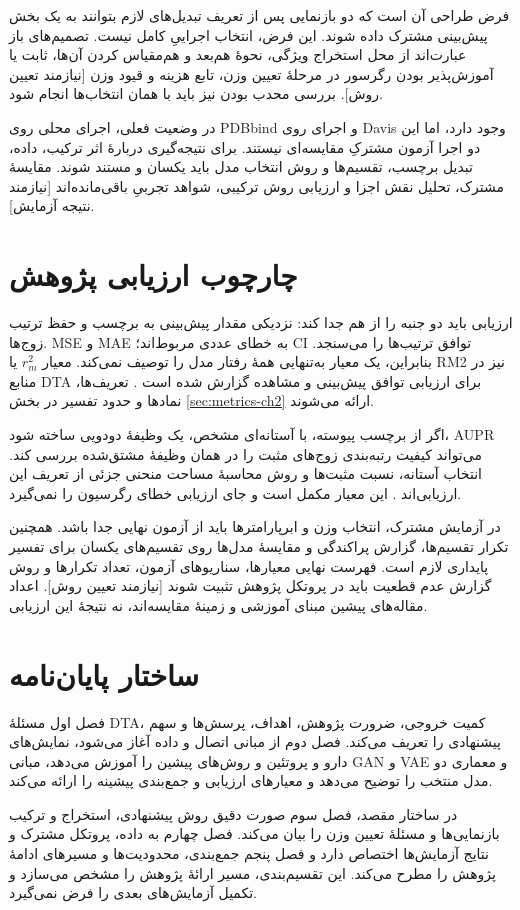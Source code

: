 فرض طراحی آن است که دو بازنمایی پس از تعریف تبدیل‌های لازم بتوانند به یک بخش پیش‌بینی مشترک داده شوند. این فرض، انتخاب اجراییِ کامل نیست. تصمیم‌های باز عبارت‌اند از محل استخراج ویژگی، نحوهٔ هم‌بعد و هم‌مقیاس کردن آن‌ها، ثابت یا آموزش‌پذیر بودن رگرسور در مرحلهٔ تعیین وزن، تابع هزینه و قیود وزن [نیازمند تعیین روش]. بررسی محدب بودن نیز باید با همان انتخاب‌ها انجام شود.

در وضعیت فعلی، اجرای محلی  روی PDBbind و اجرای  روی Davis وجود دارد، اما این دو اجرا آزمون مشترکِ مقایسه‌ای نیستند. برای نتیجه‌گیری دربارهٔ اثر ترکیب، داده، تبدیل برچسب، تقسیم‌ها و روش انتخاب مدل باید یکسان و مستند شوند. مقایسهٔ مشترک، تحلیل نقش اجزا و ارزیابی روش ترکیبی، شواهد تجربیِ باقی‌مانده‌اند [نیازمند نتیجه آزمایش].

\section{چارچوب ارزیابی پژوهش}
\label{sec:metrics-ch1}
ارزیابی باید دو جنبه را از هم جدا کند: نزدیکی مقدار پیش‌بینی به برچسب و حفظ ترتیب زوج‌ها. MSE و MAE به خطای عددی مربوط‌اند؛ CI توافق ترتیب‌ها را می‌سنجد. بنابراین، یک معیار به‌تنهایی همهٔ رفتار مدل را توصیف نمی‌کند. معیار $r_m^2$ یا RM2 نیز در منابع DTA برای ارزیابی توافق پیش‌بینی و مشاهده گزارش شده است \cite{Ozturk18DeepDTA,Chai14Errors}. تعریف‌ها، نمادها و حدود تفسیر در بخش \ref{sec:metrics-ch2} ارائه می‌شوند.

اگر از برچسب پیوسته، با آستانه‌ای مشخص، یک وظیفهٔ دودویی ساخته شود، AUPR می‌تواند کیفیت رتبه‌بندی زوج‌های مثبت را در همان وظیفهٔ مشتق‌شده بررسی کند. انتخاب آستانه، نسبت مثبت‌ها و روش محاسبهٔ مساحت منحنی جزئی از تعریف این ارزیابی‌اند \cite{Saito15PR}. این معیار مکمل است و جای ارزیابی خطای رگرسیون را نمی‌گیرد.

در آزمایش مشترک، انتخاب وزن و ابرپارامترها باید از آزمون نهایی جدا باشد. همچنین تکرار تقسیم‌ها، گزارش پراکندگی و مقایسهٔ مدل‌ها روی تقسیم‌های یکسان برای تفسیر پایداری لازم است. فهرست نهایی معیارها، سناریوهای آزمون، تعداد تکرارها و روش گزارش عدم قطعیت باید در پروتکل پژوهش تثبیت شوند [نیازمند تعیین روش]. اعداد مقاله‌های پیشین مبنای آموزشی و زمینهٔ مقایسه‌اند، نه نتیجهٔ این ارزیابی.

\section{ساختار پایان‌نامه}
\label{sec:sakhtar}
فصل اول مسئلهٔ DTA، کمیت خروجی، ضرورت پژوهش، اهداف، پرسش‌ها و سهم پیشنهادی را تعریف می‌کند. فصل دوم از مبانی اتصال و داده آغاز می‌شود، نمایش‌های دارو و پروتئین و روش‌های پیشین را آموزش می‌دهد، مبانی GAN و VAE و معماری دو مدل منتخب را توضیح می‌دهد و معیارهای ارزیابی و جمع‌بندی پیشینه را ارائه می‌کند.

در ساختار مقصد، فصل سوم صورت دقیق روش پیشنهادی، استخراج و ترکیب بازنمایی‌ها و مسئلهٔ تعیین وزن را بیان می‌کند. فصل چهارم به داده، پروتکل مشترک و نتایج آزمایش‌ها اختصاص دارد و فصل پنجم جمع‌بندی، محدودیت‌ها و مسیرهای ادامهٔ پژوهش را مطرح می‌کند. این تقسیم‌بندی، مسیر ارائهٔ پژوهش را مشخص می‌سازد و تکمیل آزمایش‌های بعدی را فرض نمی‌گیرد.
